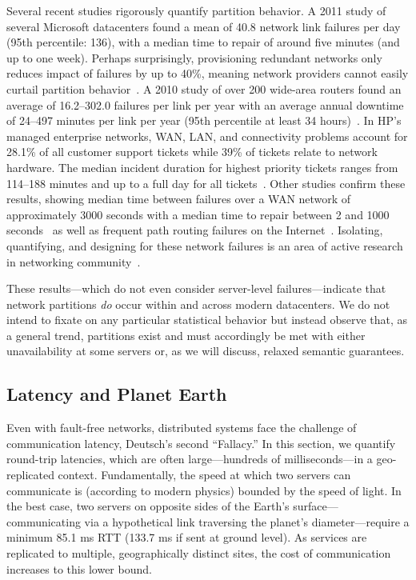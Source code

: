 Several recent studies rigorously quantify partition behavior. A 2011
study of several Microsoft datacenters found a mean of 40.8 network
link failures per day (95th percentile: 136), with a median time to
repair of around five minutes (and up to one week). Perhaps
surprisingly, provisioning redundant networks only reduces impact of
failures by up to 40\%, meaning network providers cannot easily
curtail partition behavior~\cite{sigcomm-dc}. A 2010 study of over 200
wide-area routers found an average of 16.2--302.0 failures per link
per year with an average annual downtime of 24--497 minutes per link
per year (95th percentile at least 34 hours)~\cite{sigcomm-wan}. In
HP's managed enterprise networks, WAN, LAN, and connectivity problems
account for 28.1\% of all customer support tickets while 39\% of
tickets relate to network hardware.  The median incident duration for
highest priority tickets ranges from 114--188 minutes and up to a full
day for all tickets~\cite{turner2012failure}. Other studies confirm
these results, showing median time between failures over a WAN network
of approximately 3000 seconds with a median time to repair between 2
and 1000 seconds~\cite{ip-backbone-failures} as well as frequent path
routing failures on the Internet~\cite{labovitz-failures}. Isolating,
quantifying, and designing for these network failures is an area of
active research in networking
community~\cite{uw-failure-networks}.

These results---which do not even consider server-level
failures---indicate that network partitions \textit{do} occur within
and across modern datacenters. We do not intend to fixate on any
particular statistical behavior but instead observe that, as a general
trend, partitions exist and must accordingly be met with either
unavailability at some servers or, as we will discuss, relaxed
semantic guarantees.

\subsection{Latency and Planet Earth}
\label{sec:latency}

Even with fault-free networks, distributed systems face the challenge
of communication latency, Deutsch's second ``Fallacy.'' In this
section, we quantify round-trip latencies, which are often
large---hundreds of milliseconds---in a geo-replicated context.
Fundamentally, the speed at which two servers can communicate is
(according to modern physics) bounded by the speed of light. In the
best case, two servers on opposite sides of the Earth's
surface---communicating via a hypothetical link traversing the
planet's diameter---require a minimum 85.1 ms RTT (133.7 ms if sent at
ground level). As services are replicated to multiple, geographically
distinct sites, the cost of communication increases to this lower
bound.


